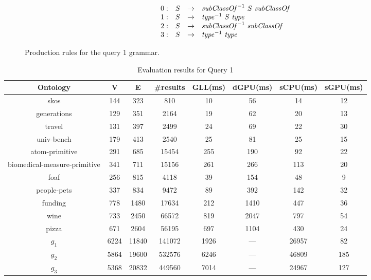 \begin{figure}[h]
   \[
\begin{array}{rccl}
   0: & S & \rightarrow & \text{\emph{subClassOf}}^{-1} \ S \ \text{\emph{subClassOf}} \\ 
   1: & S & \rightarrow & \text{\emph{type}}^{-1} \ S \ \text{\emph{type}} \\ 
   2: & S & \rightarrow & \text{\emph{subClassOf}}^{-1} \ \text{\emph{subClassOf}} \\ 
   3: & S & \rightarrow & \text{\emph{type}}^{-1} \ \text{\emph{type}} \\ 
\end{array}
\]
\caption{Production rules for the query 1 grammar.}
\label{ProductionRulesQuery1}
\end{figure}

\begin{table*}[ht]
\centering
\caption{Evaluation results for Query 1}
\label{tbl1}

\begin{tabular}{ | c | c | c | c | c | c | c | c |}
\hline
Ontology & V & E & \#results & GLL(ms) & dGPU(ms) & sCPU(ms) & sGPU(ms)\\
\hline 
\hline
skos        & 144 & 323 & 810 & 10 & 56 & 14 & 12\\
generations & 129 & 351 & 2164 & 19 & 62 & 20 & 13\\
travel      & 131 & 397 & 2499 & 24 & 69 & 22 & 30\\
univ-bench  & 179 & 413 & 2540 & 25 & 81 & 25 & 15\\
atom-primitive & 291 & 685 & 15454 & 255 & 190 & 92 & 22\\
biomedical-measure-primitive & 341 & 711 & 15156 & 261 & 266 & 113 & 20\\
foaf        & 256 & 815 & 4118 & 39 & 154 & 48 & 9\\
people-pets & 337 & 834 & 9472 & 89 & 392 & 142 & 32\\
funding     & 778 & 1480 & 17634 & 212 & 1410 & 447 & 36\\
wine        & 733 & 2450 & 66572 & 819 & 2047 & 797 & 54\\
pizza       & 671 & 2604 & 56195 & 697 & 1104 & 430 & 24\\
$g_{1}$     & 6224 & 11840 & 141072 & 1926 & --- & 26957 & 82\\
$g_{2}$     & 5864 & 19600 & 532576 & 6246 & --- & 46809 & 185\\
$g_{3}$     & 5368 & 20832 & 449560 & 7014 & --- & 24967 & 127\\
\hline
\end{tabular}

\end{table*}

